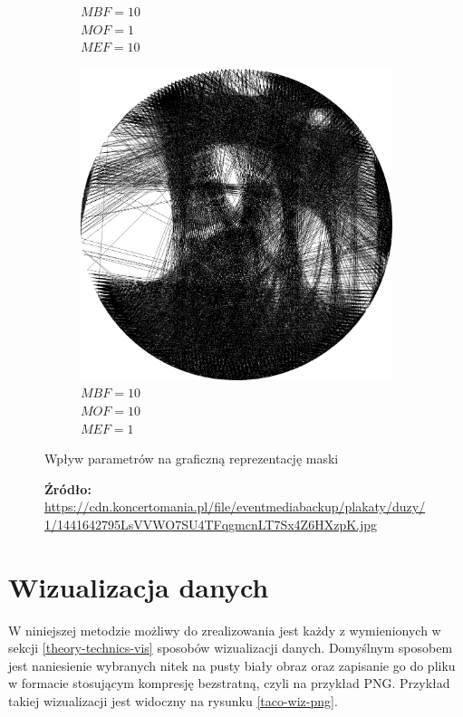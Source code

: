 \begin{figure}[H]
\begin{subfigure}{0.32\textwidth}
        \caption{\(MBF = 10\) \\ \(MOF = 1\) \\ \(MEF = 10\)}
        \label{mine-param-taco-thread-h}
    \end{subfigure}
    \begin{subfigure}{0.32\textwidth}
        \centering
        \includegraphics[width = \textwidth]{img/4-mine/taco-thread/taco_e_i3000_c20_inv0_bg10_obj10_ed1.png}
        \caption{\(MBF = 10\) \\ \(MOF = 10\) \\ \(MEF = 1\)}
        \label{mine-param-taco-thread-i}
    \end{subfigure}
    \caption{Wpływ parametrów na graficzną reprezentację maski}
    \caption*{\footnotesize{\textbf{Źródło:} {\url{https://cdn.koncertomania.pl/file/eventmediabackup/plakaty/duzy/1/1441642795LsVVWO7SU4TFqgmcnLT7Sx4Z6HXzpK.jpg}}}}
    \label{mine-param-taco-thread}
    \end{figure}
    \section{Wizualizacja danych}
    W niniejszej metodzie możliwy do zrealizowania jest każdy z wymienionych w sekcji \ref{theory-technics-vis} sposobów wizualizacji danych. Domyślnym sposobem jest naniesienie wybranych nitek na pusty biały obraz oraz zapisanie go do pliku w formacie stosującym kompresję bezstratną, czyli na przykład PNG. Przykład takiej wizualizacji jest widoczny na rysunku \ref{taco-wiz-png}.
    
